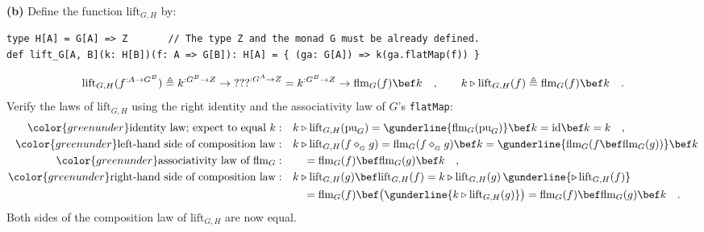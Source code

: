 \textbf{(b)} Define the function $\text{lift}_{G,H}$ by:
\begin{lstlisting}
type H[A] = G[A] => Z       // The type Z and the monad G must be already defined.
def lift_G[A, B](k: H[B])(f: A => G[B]): H[A] = { (ga: G[A]) => k(ga.flatMap(f)) }
\end{lstlisting}
\[
\text{lift}_{G,H}(f^{:A\rightarrow G^{B}})\triangleq k^{:G^{B}\rightarrow Z}\rightarrow\text{???}^{:G^{A}\rightarrow Z}=k^{:G^{B}\rightarrow Z}\rightarrow\text{flm}_{G}(f)\bef k\quad,\quad\quad k\triangleright\text{lift}_{G,H}(f)\triangleq\text{flm}_{G}(f)\bef k\quad.
\]
Verify the laws of $\text{lift}_{G,H}$ using the right identity and
the associativity law of $G$\textsf{'}s \lstinline!flatMap!:
\begin{align*}
{\color{greenunder}\text{identity law; expect to equal }k:}\quad & k\triangleright\text{lift}_{G,H}(\text{pu}_{G})=\gunderline{\text{flm}_{G}(\text{pu}_{G})}\bef k=\text{id}\bef k=k\quad,\\
{\color{greenunder}\text{left-hand side of composition law}:}\quad & k\triangleright\text{lift}_{G,H}(f\diamond_{_{G}}g)=\text{flm}_{G}(f\diamond_{_{G}}g)\bef k=\gunderline{\text{flm}_{G}(f\bef\text{flm}_{G}(g))}\bef k\\
{\color{greenunder}\text{associativity law of }\text{flm}_{G}:}\quad & \quad=\text{flm}_{G}(f)\bef\text{flm}_{G}(g)\bef k\quad,\\
{\color{greenunder}\text{right-hand side of composition law}:}\quad & k\triangleright\text{lift}_{G,H}(g)\bef\text{lift}_{G,H}(f)=k\triangleright\text{lift}_{G,H}(g)\,\gunderline{\triangleright\,\text{lift}_{G,H}(f)}\\
 & \quad=\text{flm}_{G}(f)\bef\big(\gunderline{k\triangleright\text{lift}_{G,H}(g)}\big)=\text{flm}_{G}(f)\bef\text{flm}_{G}(g)\bef k\quad.
\end{align*}
Both sides of the composition law of $\text{lift}_{G,H}$ are now
equal.

